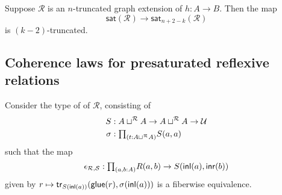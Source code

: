 \begin{conj}
Suppose $\mathcal{R}$ is an $n$-truncated graph extension of $h:A\to B$. Then the map
\begin{equation*}
\mathsf{sat}(\mathcal{R})\to \mathsf{sat}_{n+2-k}(\mathcal{R})
\end{equation*}
is $(k-2)$-truncated.
\end{conj}

\subsection{Coherence laws for presaturated reflexive relations}
Consider the type of  of $\mathcal{R}$, consisting of
\begin{align*}
S & : A\sqcup^{\mathcal{R}}A \to A\sqcup^{\mathcal{R}} A \to \UU \\
\sigma & : \prd{t:A\sqcup^{\mathcal{R}} A} S(a,a)
\end{align*}
such that the map
\begin{equation*}
\epsilon_{\mathcal{R},\mathcal{S}} : \prd{a,b:A}R(a,b)\to S(\inl(a),\inr(b))
\end{equation*}
given by $r\mapsto \mathsf{tr}_{S({\mathsf{inl}}(a))}(\mathsf{glue}(r),\sigma({\mathsf{inl}}(a)))$ is a fiberwise equivalence.

